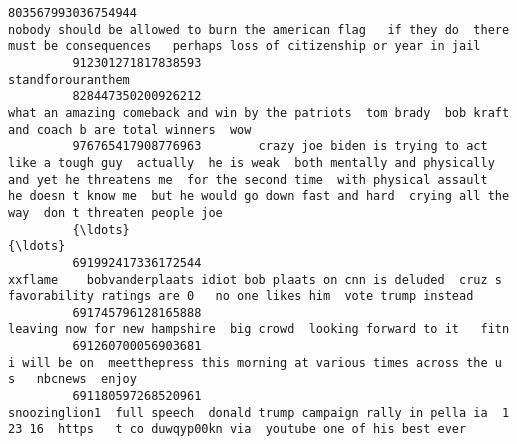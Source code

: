 \documentclass[11pt]{article}
\begin{document}
\begin{Verbatim}[commandchars=\\\{\}]
         803567993036754944                                                                                                                                                nobody should be allowed to burn the american flag   if they do  there must be consequences   perhaps loss of citizenship or year in jail    
         912301271817838593                                                                                                                                                                                                                                                                         standforouranthem   
         828447350200926212                                                                                                                                                                                what an amazing comeback and win by the patriots  tom brady  bob kraft and coach b are total winners  wow    
         976765417908776963        crazy joe biden is trying to act like a tough guy  actually  he is weak  both mentally and physically  and yet he threatens me  for the second time  with physical assault  he doesn t know me  but he would go down fast and hard  crying all the way  don t threaten people joe    
         {\ldots}                                                                                                                                                                                                                                                                                                      {\ldots}   
         691992417336172544                                                                                                                                                 xxflame    bobvanderplaats idiot bob plaats on cnn is deluded  cruz s favorability ratings are 0   no one likes him  vote trump instead     
         691745796128165888                                                                                                                                                                                                                    leaving now for new hampshire  big crowd  looking forward to it   fitn   
         691260700056903681                                                                                                                                                                                                 i will be on  meetthepress this morning at various times across the u s   nbcnews  enjoy    
         691180597268520961                                                                                                                                                  snoozinglion1  full speech  donald trump campaign rally in pella ia  1 23 16  https   t co duwqyp00kn via  youtube one of his best ever    

\end{Verbatim}
\end{document}
